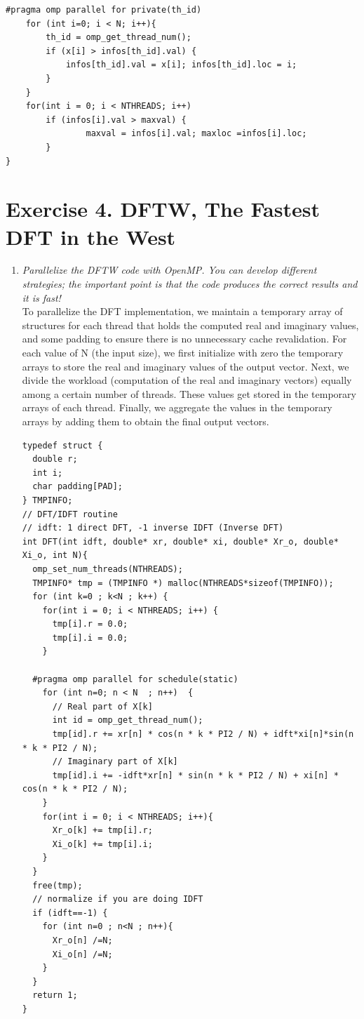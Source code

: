 \documentclass[12pt]{article}
\begin{document}
\begin{enumerate}
\begin{lstlisting}[style=CStyle]
	#pragma omp parallel for private(th_id)
	for (int i=0; i < N; i++){
		th_id = omp_get_thread_num();
		if (x[i] > infos[th_id].val) {
			infos[th_id].val = x[i]; infos[th_id].loc = i;
		}
	}
	for(int i = 0; i < NTHREADS; i++)
		if (infos[i].val > maxval) {
				maxval = infos[i].val; maxloc =infos[i].loc;
		}
}
    \end{lstlisting}
\end{enumerate}
\section{Exercise 4. DFTW, The Fastest DFT in the West}
\begin{enumerate}
    \item \textit{Parallelize the DFTW code with OpenMP. You can develop different strategies; the important point is that the code produces the correct results and it is fast!}\\
    To parallelize the DFT implementation, we maintain a temporary array of structures for each thread that holds the computed real and imaginary values, and some padding to ensure there is no unnecessary cache revalidation. For each value of N (the input size), we first initialize with zero the temporary arrays to store the real and imaginary values of the output vector. Next, we divide the workload (computation of the real and imaginary vectors) equally among a certain number of threads. These values get stored in the temporary arrays of each thread. Finally, we aggregate the values in the temporary arrays by adding them to obtain the final output vectors.\\
    \begin{lstlisting}[style=CStyle]
typedef struct {
  double r;
  int i;
  char padding[PAD];
} TMPINFO;
// DFT/IDFT routine
// idft: 1 direct DFT, -1 inverse IDFT (Inverse DFT)
int DFT(int idft, double* xr, double* xi, double* Xr_o, double* Xi_o, int N){
  omp_set_num_threads(NTHREADS);
  TMPINFO* tmp = (TMPINFO *) malloc(NTHREADS*sizeof(TMPINFO));
  for (int k=0 ; k<N ; k++) {
    for(int i = 0; i < NTHREADS; i++) {
      tmp[i].r = 0.0;
      tmp[i].i = 0.0;	
    }
  
  #pragma omp parallel for schedule(static)
    for (int n=0; n < N  ; n++)  {
      // Real part of X[k]
      int id = omp_get_thread_num();
      tmp[id].r += xr[n] * cos(n * k * PI2 / N) + idft*xi[n]*sin(n * k * PI2 / N);
      // Imaginary part of X[k]
      tmp[id].i += -idft*xr[n] * sin(n * k * PI2 / N) + xi[n] * cos(n * k * PI2 / N);
    }
    for(int i = 0; i < NTHREADS; i++){
      Xr_o[k] += tmp[i].r;
      Xi_o[k] += tmp[i].i;	
    }
  }
  free(tmp);
  // normalize if you are doing IDFT
  if (idft==-1) {
    for (int n=0 ; n<N ; n++){
      Xr_o[n] /=N;
      Xi_o[n] /=N;
    }
  }
  return 1; 
}
    \end{lstlisting}
    

\end{enumerate}
\end{document}

